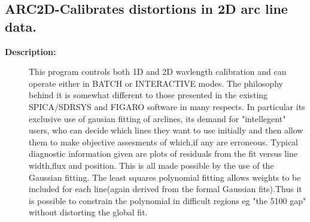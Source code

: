 \subsection{ARC2D-\label{ARC2D}Calibrates distortions in 2D arc line data.}
\begin{description}

\item [{\bf Description:}]
   This program controls both 1D and 2D wavlength calibration and
   can operate either in BATCH or INTERACTIVE modes.
   The philosophy behind it is somewhat different to those presented
   in the existing SPICA/SDRSYS and FIGARO software in many respects.
   In particular its exclusive use of gausian fitting of arclines, its
   demand for "intellegent" users, who can decide which lines they want
   to use initially and then allow them to make objective assesments of
   which,if any are erroneous. Typical diagnostic information given are
   plots of residuals from the fit versus line width,flux and position.
   This is all made possible by the use of the Gaussian fitting.
     The least squares polynomial fitting allows weights to be included
   for each line(again derived from the formal Gaussian fits).Thus it
   is possible to constrain the polynomial in difficult regions
   eg "the 5100 gap" without distorting the global fit.


\end{description}

